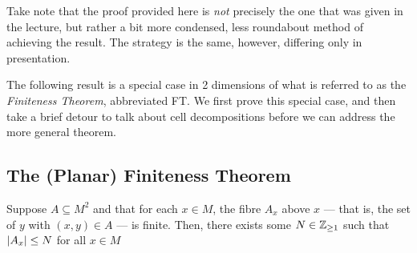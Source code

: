 \begin{svgraybox}
	Take note that the proof provided here is \emph{not} precisely the one that was given in the lecture, but rather a bit more condensed, less roundabout method of achieving the result. The strategy is the same, however, differing only in presentation.
\end{svgraybox}


The following result is a special case in 2 dimensions of what is referred to as the \emph{Finiteness Theorem}, abbreviated FT. We first prove this special case, and then take a brief detour to talk about cell decompositions before we can address the more general theorem.

\subsection{The (Planar) Finiteness Theorem}

\begin{theorem}
	\label{thm:2finiteness}
	Suppose $A \subseteq M^2$ and that for each $x \in M$, the fibre $A_x$ above $x$ — that is, the set of $y$ with $(x, y) \in A$ — is finite. Then, there exists some $N \in \mathbb{Z}_{\geq 1}$ such that $\vert A_x\vert \leq N$ for all $x \in M$
\end{theorem}

